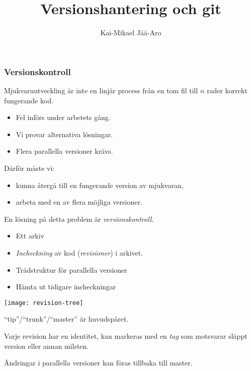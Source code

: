 \documentclass[swedish]{beamer}
\title{Versionshantering och git}
\author{Kai-Mikael Jää-Aro}
\date{}
\begin{document}
\setlength{\intextsep}{0mm}

\begin{frame}
\titlepage
\end{frame}

\begin{frame}
  \frametitle{Versionskontroll}
Mjukvaruutveckling är inte en linjär process från en tom fil till \(n\) rader korrekt fungerande kod.
\begin{itemize}
\item Fel införs under arbetets gång.
\item Vi provar alternativa lösningar.
\item Flera parallella versioner krävs.
\end{itemize}

Därför måste vi:
\begin{itemize}
\item kunna återgå till en fungerande version av mjukvaran,
\item arbeta med en av flera möjliga versioner.
\end{itemize}

En lösning på detta problem är \emph{versionskontroll}.
\end{frame}

\begin{frame}
  \begin{itemize}
  \item Ett arkiv
  \item\emph{Incheckning} av kod (\emph{revisioner}) i arkivet.
  \item  Trädstruktur för parallella versioner 
  \item Hämta ut tidigare incheckningar
  \end{itemize}
\end{frame}

\begin{frame}
\texttt{[image: revision-tree]}
\end{frame}

\begin{frame}
``tip''/``trunk''/``master'' är huvudspåret.

Varje revision har en identitet, kan markeras med en \emph{tag} som 
motsvarar släppt version eller annan milsten.

Ändringar i parallella versioner kan föras tillbaka till master.
\end{frame}
\end{document}
